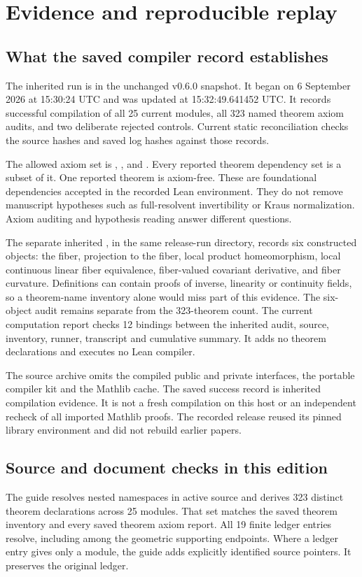 \section{Evidence and reproducible replay}
\label{sec:replay}

\subsection{What the saved compiler record establishes}
The inherited run is  in the unchanged v0.6.0 snapshot. It began on 6 September 2026 at 15:30:24 UTC and was updated at 15:32:49.641452 UTC. It records successful compilation of all 25 current modules, all 323 named theorem axiom audits, and two deliberate rejected controls. Current static reconciliation checks the source hashes and saved log hashes against those records.

The allowed axiom set is , , and . Every reported theorem dependency set is a subset of it. One reported theorem is axiom-free. These are foundational dependencies accepted in the recorded Lean environment. They do not remove manuscript hypotheses such as full-resolvent invertibility or Kraus normalization. Axiom auditing and hypothesis reading answer different questions.

The separate inherited , in the same release-run directory, records six constructed objects: the fiber, projection to the fiber, local product homeomorphism, local continuous linear fiber equivalence, fiber-valued covariant derivative, and fiber curvature. Definitions can contain proofs of inverse, linearity or continuity fields, so a theorem-name inventory alone would miss part of this evidence. The six-object audit remains separate from the 323-theorem count. The current computation report checks 12 bindings between the inherited audit, source, inventory, runner, transcript and cumulative summary. It adds no theorem declarations and executes no Lean compiler.

The source archive omits the compiled public and private interfaces, the portable compiler kit and the Mathlib cache. The saved success record is inherited compilation evidence. It is not a fresh compilation on this host or an independent recheck of all imported Mathlib proofs. The recorded release reused its pinned library environment and did not rebuild earlier papers.

\subsection{Source and document checks in this edition}
The guide resolves nested namespaces in active source and derives 323 distinct theorem declarations across 25 modules. That set matches the saved theorem inventory and every saved theorem axiom report. All 19 finite ledger entries resolve, including  among the geometric supporting endpoints. Where a ledger entry gives only a module, the guide adds explicitly identified source pointers. It preserves the original ledger.

